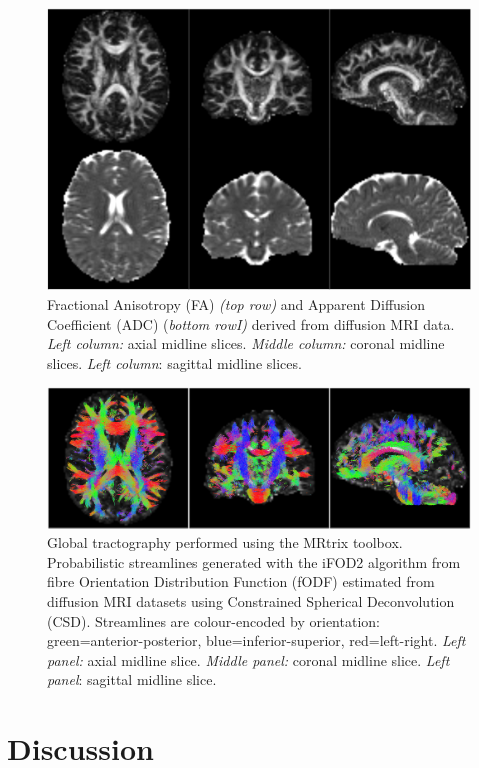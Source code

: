 \documentclass[smallextended]{svjour3}       %
\begin{document}
\begin{figure}
    \centering
    \includegraphics[width=\textwidth]{figures/fa_adc}
  \caption{Fractional Anisotropy (FA) \emph{(top row)} and
Apparent Diffusion Coefficient (ADC) (\emph{bottom rowI)} derived from
diffusion MRI data. \emph{Left column:} axial midline slices.
\emph{Middle column:} coronal midline slices. \emph{Left column}:
sagittal midline slices.}
\label{fig:fa_adc}
\end{figure}


\begin{figure}
    \centering
    \includegraphics[width=\textwidth]{figures/tractography}
  \caption{Global tractography performed using the MRtrix
toolbox. Probabilistic streamlines generated with the iFOD2 algorithm
from fibre Orientation Distribution Function (fODF) estimated from
diffusion MRI datasets using Constrained Spherical Deconvolution (CSD).
Streamlines are colour-encoded by orientation: green=anterior-posterior,
blue=inferior-superior, red=left-right. \emph{Left panel:} axial midline
slice. \emph{Middle panel:} coronal midline slice. \emph{Left panel}:
sagittal midline slice.}
\label{fig:tractography}
\end{figure}

\section*{Discussion}
\label{discussion}
\end{document}
